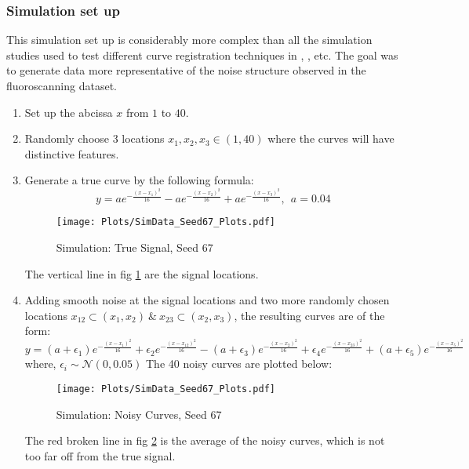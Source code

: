 \subsubsection*{Simulation set up}
This simulation set up is considerably more complex than all the simulation studies used to test different curve registration techniques in \cite{Kneip_Ramsay_2008_JASA}, \cite{Srivastava_etal_2011_v2_arXiv}, etc. The goal was to generate data more representative of the noise structure observed in the fluoroscanning dataset. 
\begin{enumerate}
\item Set up the abcissa $x$ from $1$ to $40$.

\item Randomly choose 3 locations $x_1, x_2, x_3 \in (1, 40)$ where the curves will have distinctive features.

\item Generate a true curve by the following formula:
\[ y = ae^{-\frac{(x - x_1)^2}{16}} - ae^{-\frac{(x - x_2)^2}{16}} + ae^{-\frac{(x - x_3)^2}{16}},\ \ a=0.04  \]
\begin{figure}[H]
\begin{center}
\texttt{[image: Plots/SimData\_Seed67\_Plots.pdf]}
\end{center}
\caption{Simulation: True Signal, Seed 67}
\label{fig:FigSim_True}
\end{figure}
The vertical line in fig \ref{fig:FigSim_True} are the signal locations.

\item Adding smooth noise at the signal locations and two more randomly chosen locations $x_{12} \subset (x_1, x_2) \ \& \ x_{23} \subset (x_2, x_3) $, the resulting curves are of the form:
\[ y = (a + \epsilon_1)e^{-\frac{(x - x_1)^2}{16}} + \epsilon_2e^{-\frac{(x - x_12)^2}{16}} - (a + \epsilon_3)e^{-\frac{(x - x_2)^2}{16}} + \epsilon_4e^{-\frac{(x - x_23)^2}{16}} + (a + \epsilon_5)e^{-\frac{(x - x_5)^2}{16}}\]
where, $\epsilon_i \sim \mathcal{N}(0, 0.05)$
The 40 noisy curves are plotted below:
\begin{figure}[H]
\begin{center}
\texttt{[image: Plots/SimData\_Seed67\_Plots.pdf]}
\end{center}
\caption{Simulation: Noisy Curves, Seed 67}
\label{fig:FigSim_Noisy}
\end{figure}
The red broken line in fig \ref{fig:FigSim_Noisy} is the average of the noisy curves, which is not too far off from the true signal. 


\end{enumerate}
